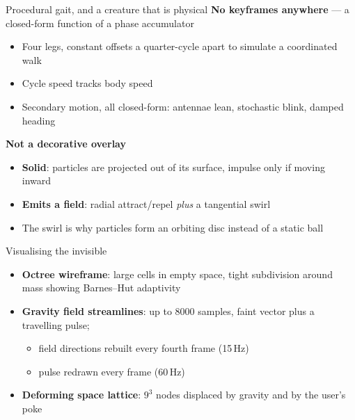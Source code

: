 \documentclass[10pt]{beamer}
\begin{document}
\begin{frame}{Procedural gait, and a creature that is physical}
	\textbf{No keyframes anywhere} --- a closed-form function of a phase accumulator
	\begin{itemize}
		\item Four legs, constant offsets a quarter-cycle apart to simulate a coordinated walk
		\item Cycle speed tracks body speed
		\item Secondary motion, all closed-form: antennae lean, stochastic blink, damped heading
	\end{itemize}
	\vspace{1ex}
	\textbf{Not a decorative overlay}
	\begin{itemize}
		\item \textbf{Solid}: particles are projected out of its surface, impulse only if moving inward
		\item \textbf{Emits a field}: radial attract/repel \emph{plus} a tangential swirl
		\item The swirl is why particles form an orbiting disc instead of a static ball
	\end{itemize}
\end{frame}

\begin{frame}{Visualising the invisible}
	\begin{itemize}
		\item \textbf{Octree wireframe}: large cells in empty space, tight subdivision around mass showing Barnes--Hut adaptivity
		\item \textbf{Gravity field streamlines}: up to 8000 samples, faint vector plus a travelling pulse;
		      \begin{itemize}
			      \item field directions rebuilt every fourth frame (15\,Hz)
			      \item pulse redrawn every frame (60\,Hz)
		      \end{itemize}
		\item \textbf{Deforming space lattice}: $9^3$ nodes displaced by gravity and by the user's poke
	\end{itemize}
\end{frame}
\end{document}
